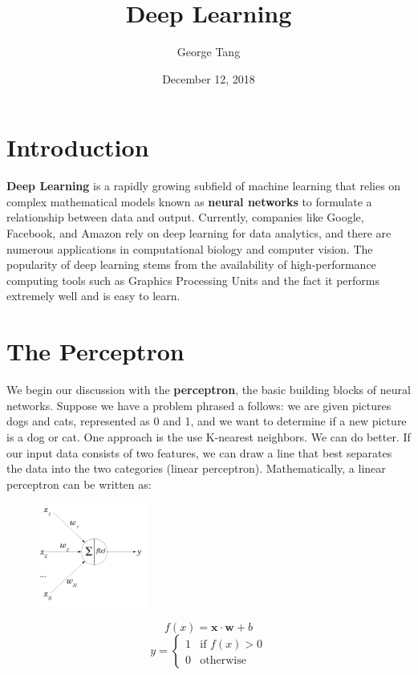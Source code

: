 \documentclass{article}
\title{Deep Learning}
\author{George Tang}
\date{December 12, 2018}
\let\vec\mathbf
\begin{document}
\maketitle

\section{Introduction}
\textbf{Deep Learning} is a rapidly growing subfield of machine learning that relies on complex mathematical models known as \textbf{neural networks} to formulate a relationship between data and output. Currently, companies like Google, Facebook, and Amazon rely on deep learning for data analytics, and there are numerous applications in computational biology and computer vision. The popularity of deep learning stems from the availability of high-performance computing tools such as Graphics Processing Units and the fact it performs extremely well and is easy to learn. 

\section{The Perceptron}
We begin our discussion with the \textbf{perceptron}, the basic building blocks of neural networks. Suppose we have a problem phrased a follows: we are given pictures dogs and cats, represented as 0 and 1, and we want to determine if a new picture is a dog or cat. One approach is the use K-nearest neighbors. We can do better. If our input data consists of two features, we can draw a line that best separates the data into the two categories (linear perceptron). Mathematically, a linear perceptron can be written as: 

\begin{figure}
\vspace{-10pt}
  \begin{center}
    \includegraphics[width=0.325\textwidth]{perp.jpg}
  \end{center}
\end{figure}

$$ f(x) = \vec{x} \cdot \vec{w} + b $$ 
\[
y = 
\begin{cases}
    1 & \text{if } f(x) > 0 \\
    0 & \text{otherwise}
\end{cases} 
\]
\end{document}
